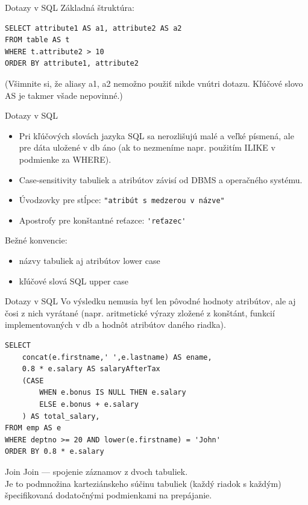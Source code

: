 \documentclass[12pt]{beamer}
\begin{document}
\begin{frame}[fragile]{Dotazy v SQL}
Základná štruktúra:
\begin{verbatim}
SELECT attribute1 AS a1, attribute2 AS a2
FROM table AS t
WHERE t.attribute2 > 10
ORDER BY attribute1, attribute2
\end{verbatim}
(Všimnite si, že aliasy a1, a2 nemožno použiť nikde vnútri dotazu. Kľúčové slovo AS je takmer všade nepovinné.)
\end{frame}

\begin{frame}[fragile]{Dotazy v SQL}
\begin{itemize}
\item Pri kľúčových slovách jazyka SQL sa nerozlišujú malé a veľké písmená,
ale pre dáta uložené v db áno (ak to nezmeníme napr. použitím ILIKE v podmienke za WHERE).
\item Case-sensitivity tabuliek a atribútov závisí od DBMS a operačného systému.
\item Úvodzovky pre stĺpce: \verb|"atribút s medzerou v názve"|
\item Apostrofy pre konštantné reťazce: \verb|'reťazec'|
\end{itemize}

Bežné konvencie:
\begin{itemize}
\item názvy tabuliek aj atribútov lower case
\item kľúčové slová SQL upper case
\end{itemize}
\end{frame}

\begin{frame}[fragile]{Dotazy v SQL}
Vo výsledku nemusia byť len pôvodné hodnoty atribútov, ale aj čosi z nich vyrátané (napr. aritmetické výrazy zložené z konštánt, funkcií implementovaných v db a hodnôt atribútov daného riadka).\\[3mm]

\begin{verbatim}
SELECT
    concat(e.firstname,' ',e.lastname) AS ename,
    0.8 * e.salary AS salaryAfterTax
    (CASE
        WHEN e.bonus IS NULL THEN e.salary
        ELSE e.bonus + e.salary
    ) AS total_salary,
FROM emp AS e
WHERE deptno >= 20 AND lower(e.firstname) = 'John'
ORDER BY 0.8 * e.salary
\end{verbatim}
\end{frame}


\begin{frame}{Join}
\alert{Join} --- spojenie záznamov z dvoch tabuliek.\\[3mm]

Je to podmnožina karteziánskeho súčinu tabuliek (každý riadok s každým)
špecifikovaná dodatočnými podmienkami na prepájanie.
\end{frame}
\end{document}
